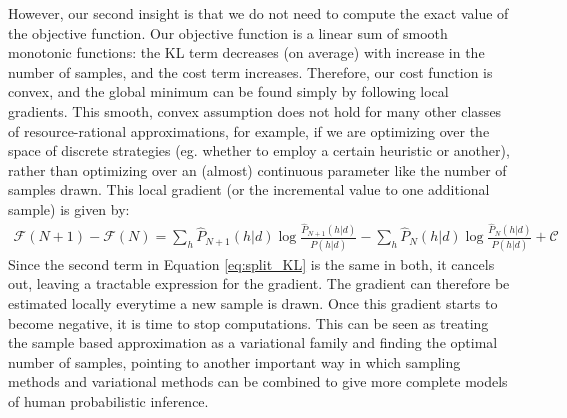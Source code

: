 However, our second insight is that we do not need to compute the exact value of the objective function. Our objective function is a linear sum of smooth monotonic functions: the KL term decreases (on average) with increase in the number of samples, and the cost term increases. Therefore, our cost function is convex, and the global minimum can be found simply by following local gradients. This smooth, convex assumption does not hold for many other classes of resource-rational approximations, for example, if we are optimizing over the space of discrete strategies (eg. whether to employ a certain heuristic or another), rather than optimizing over an (almost) continuous parameter like the number of samples drawn. This local gradient (or the incremental value to one additional sample) is given by:
\begin{align}
\mathcal{F}(N + 1) - \mathcal{F}(N) =  \sum_h \hat{P}_{N+1}(h|d) \log \frac{\hat{P}_{N+1}(h|d)}{P(h|d)} -  \sum_h \hat{P}_N(h|d) \log \frac{\hat{P}_N(h|d)}{P(h|d)} + \mathcal{C}
\end{align}
Since the second term in Equation \ref{eq:split_KL} is the same in both, it cancels out, leaving a tractable expression for the gradient. The gradient can therefore be estimated locally everytime a new sample is drawn. Once this gradient starts to become negative, it is time to stop computations. This can be seen as treating the sample based approximation as a variational family and finding the optimal number of samples\cite{saeedi17}, pointing to another important way in which sampling methods and variational methods can be combined to give more complete models of human probabilistic inference.


%


